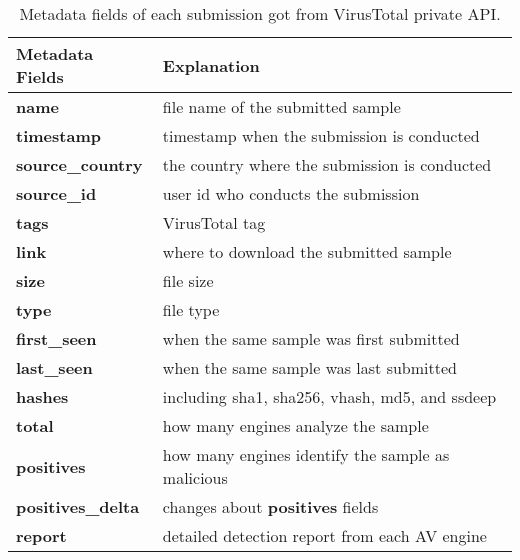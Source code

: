 \begin{table}[h!]
\centering
\footnotesize
{
\begin{tabular}{l|l}
\hline
Metadata Fields & Explanation \\
\hline                            
{\bf name}      & file name of the submitted sample \\
{\bf timestamp} & timestamp when the submission is conducted \\
{\bf source\_country} & the country where the submission is conducted \\
{\bf source\_id} & user id who conducts the submission\\
{\bf tags} & VirusTotal tag \\
{\bf link} & where to download the submitted sample \\
{\bf size} & file size \\
{\bf type} & file type \\
{\bf first\_seen} & when the same sample was first submitted \\
{\bf last\_seen} & when the same sample was last submitted \\
{\bf hashes} & including sha1, sha256, vhash, md5, and ssdeep\\
{\bf total} & how many engines analyze the sample\\
{\bf positives} & how many engines identify the sample as malicious \\
{\bf positives\_delta} & changes about {\bf positives} fields \\
{\bf report} & detailed detection report from each AV engine \\
\hline

\end{tabular}
}
\caption{Metadata fields of each submission got from VirusTotal private API.}
\label{tab:fields}
\end{table}

